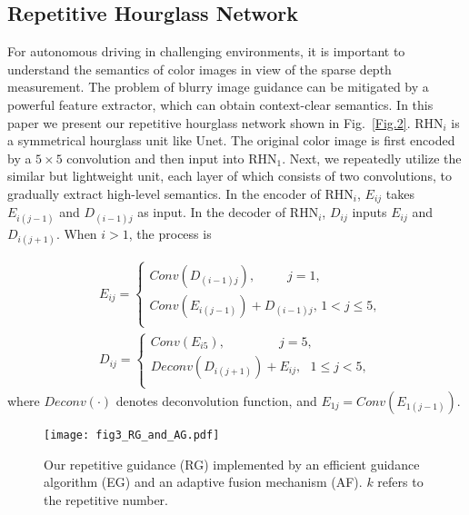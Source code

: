 \documentclass[runningheads]{llncs}
\begin{document}
\subsection{Repetitive Hourglass Network}\label{RHN}
For autonomous driving in challenging environments, it is important to understand the semantics of color images in view of the sparse depth measurement. The problem of blurry image guidance can be mitigated by a powerful feature extractor, which can obtain context-clear semantics. In this paper we present our repetitive hourglass network shown in Fig.~\ref{Fig.2}. RHN$_i$ is a symmetrical hourglass unit like Unet. The original color image is first encoded by a $5\times5$ convolution and then input into RHN$_1$. Next, we repeatedly utilize the similar but lightweight unit, each layer of which consists of two convolutions, to gradually extract high-level semantics. In the encoder of RHN$_i$, $E_{ij}$ takes $E_{i(j-1)}$ and $D_{(i-1)j}$ as input. In the decoder of RHN$_i$, $D_{ij}$ inputs $E_{ij}$ and $D_{i(j+1)}$. When $i>1$, the process is

\begin{equation}\label{e1}
\begin{split}
& {{E}_{ij}}=\left\{ \begin{matrix}
   Conv\left( {{D}_{\left( i-1 \right)j}} \right),\qquad \; \ j=1,  \\
   Conv\left( {{E}_{i\left( j-1 \right)}} \right)+{{D}_{\left( i-1 \right)j}},\, 1<j\le 5,  \\
\end{matrix} \right.\\
& {{D}_{ij}}=\left\{ \begin{matrix}
   Conv\left( {{E}_{i5}} \right),\qquad \qquad \ j=5,  \\
   Deconv\left( {{D}_{i\left( j+1 \right)}} \right)+{{E}_{ij}},\ \ \ 1\le j<5,  \\
\end{matrix} \right.
\end{split}
\end{equation}
where ${Deconv}\left( \cdot \right)$ denotes deconvolution function, and $E_{1j}=Conv(E_{1(j-1)})$.


\begin{figure}[t]
  \centering
  \texttt{[image: fig3\_RG\_and\_AG.pdf]}\\
  \caption{Our repetitive guidance (RG) implemented by an efficient guidance algorithm (EG) and an adaptive fusion mechanism (AF). $k$ refers to the repetitive number.}\label{Fig.3}
\end{figure}
\end{document}

